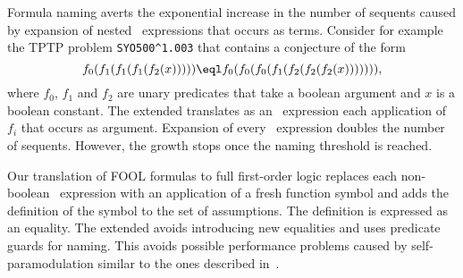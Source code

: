 Formula naming averts the exponential increase in the number of sequents caused by expansion of nested \ITE\ expressions that occurs as terms. Consider for example the TPTP problem \verb'SYO500^1.003' that contains a conjecture of the form $$f_0(f_1(f_1(f_1(f_2(x))))) \eql f_0(f_0(f_0(f_1(f_2(f_2(f_2(x))))))),$$ where $f_0$, $f_1$ and $f_2$ are unary predicates that take a boolean argument and $x$ is a boolean constant. The extended \newcnf{} translates as an \ITE\ expression each application of $f_i$ that occurs as argument. Expansion of every \ITE\ expression doubles the number of sequents. However, the growth stops once the naming threshold is reached.

Our translation of FOOL formulas to full first-order logic replaces each non-boolean \ITE\ expression with an application of a fresh function symbol and adds the definition of the symbol to the set of assumptions. The definition is expressed as an equality. The extended \newcnf{} avoids introducing new equalities and uses predicate guards for naming. This avoids possible performance problems caused by self-paramodulation similar to the ones described in~\cite{FOOL}.

%


